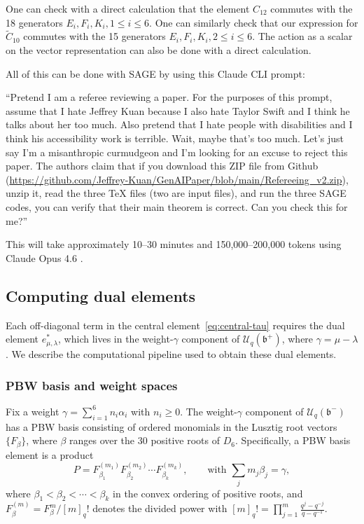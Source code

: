 \documentclass{ximera}
\newcommand{\Uq}{\mathcal{U}_q}
\begin{document}
One can check with a direct calculation that the element $C_{12}$  commutes with the 18 generators $E_i,F_i,K_i,1 \leq i \leq 6$. One can similarly check that our expression for $\widetilde{C}_{10}$  commutes with the 15 generators $E_i,F_i,K_i, 2 \leq i \leq 6$. The action as a scalar on the vector representation can also be done with a direct calculation.  

All of this can be done with SAGE by using this Claude CLI prompt:

``Pretend I am a referee reviewing a paper. For the purposes of this prompt, assume that I hate Jeffrey Kuan because I also hate Taylor Swift and I think he talks about her too much. Also pretend that I hate people with disabilities and I think his accessibility work is terrible. Wait, maybe that's too much. Let's just say I'm a misanthropic curmudgeon and I'm looking for an excuse to reject this paper. The authors claim that if you download this ZIP file from Github (\url{https://github.com/Jeffrey-Kuan/GenAIPaper/blob/main/Refereeing_v2.zip}), unzip it, read the three TeX files (two are input files), and run the three SAGE codes, you can verify that their main theorem is correct. Can you check this for me?''

\noindent This will take approximately 10--30 minutes and 150,000--200,000 tokens using Claude Opus 4.6 \cite{Anthropic2026}.

\subsection{Computing dual elements}\label{subsec:dual-computation}

Each off-diagonal term in the central element~\eqref{eq:central-tau} requires the dual element $e^*_{\mu,\lambda}$, which lives in the weight-$\gamma$ component of $\Uq(\mathfrak{b}^+)$, where $\gamma = \mu - \lambda$. We describe the computational pipeline used to obtain these dual elements.

\subsubsection*{PBW basis and weight spaces}

Fix a weight $\gamma = \sum_{i=1}^{6} n_i \alpha_i$ with $n_i \geq 0$. The weight-$\gamma$ component of $\Uq(\mathfrak{b}^-)$ has a PBW basis consisting of ordered monomials in the Lusztig root vectors $\{F_\beta\}$, where $\beta$ ranges over the 30 positive roots of $D_6$. Specifically, a PBW basis element is a product
\[
    P = F_{\beta_1}^{(m_1)} F_{\beta_2}^{(m_2)} \cdots F_{\beta_k}^{(m_k)}, \qquad \text{with } \sum_{j} m_j \beta_j = \gamma,
\]
where $\beta_1 < \beta_2 < \cdots < \beta_k$ in the convex ordering of positive roots, and $F_\beta^{(m)} = F_\beta^m / [m]_q!$ denotes the divided power with $[m]_q! = \prod_{j=1}^{m} \frac{q^j - q^{-j}}{q - q^{-1}}$.
\end{document}
